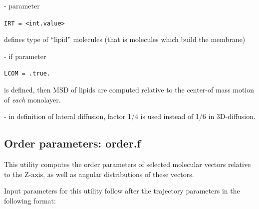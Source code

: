 \documentclass{article}
\begin{document}
- parameter

\verb|IRT = <int.value>|

defines type of ``lipid'' molecules (that is molecules which build the 
membrane)

- if parameter

\verb|LCOM = .true.|

is defined, then MSD of lipids are computed relative to the center-of mass
motion of {\it each} monolayer. 

- in definition of lateral diffusion, factor 1/4 is used 
instead of 1/6 in 3D-diffusion.

\subsection{Order parameters: order.f}

This utility computes the order parameters of selected molecular vectors 
relative to the Z-axis, as well as angular distributions of these vectors.

Input parameters for this utility follow after the trajectory parameters
in the following format:
\end{document}
